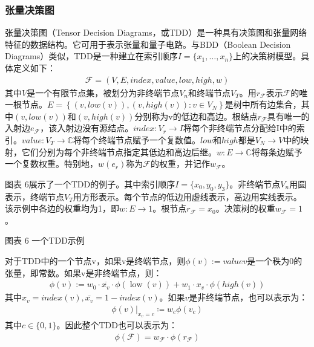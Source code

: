 \subsubsection{张量决策图}
张量决策图（Tensor Decision Diagrams，或TDD）是一种具有决策图和张量网络特征的数据结构\cite{Hong_2022}。它可用于表示张量和量子电路。与BDD（Boolean Decision Diagrams）类似，TDD是一种建立在索引顺序$I=\{x_1,\ldots,x_n\}$上的决策树模型。具体定义如下：
\begin{align}
    \mathcal{F}=\left(V,E,index,value,low,high,w\right)
\end{align}
其中$V$是一个有限节点集，被划分为非终端节点$V_n$和终端节点$V_T$。用$r_{\mathcal{F}}$表示$\mathcal{F}$的唯一根节点。$E=\left\{\left(v,low\left(v\right)\right),\left(v,high\left(v\right)\right):v\in V_N\right\}$是树中所有边集合，其中$\left(v,low\left(v\right)\right)$和$\left(v,high\left(v\right)\right)$分别称为v的低边和高边。根结点$r_{\mathcal{F}}$具有唯一的入射边$e_{\mathcal{F}}$，该入射边没有源结点。$index:V_r\rightarrow I$将每个非终端节点分配给I中的索引。$value:V_T\rightarrow\mathbb{C}$将每个终端节点赋予一个复数值。$low$和$high$都是$V_N\rightarrow V$中的映射，它们分别为每个非终端节点指定其低边和高边后继。$w:E\rightarrow\mathbb{C}$将每条边赋予一个复数权重。特别地，$w\left(e_r\right)$称为$\mathcal{F}$的权重，并记作$w_{\mathcal{F}}$。 
 
图表 6展示了一个TDD的例子。其中索引顺序$I=\{x_0,y_0,y_3\}$。非终端节点$V_n$用圆表示，终端节点$V_T$用方形表示。每个节点的低边用虚线表示，高边用实线表示。该示例中各边的权重均为1，即$w:E\rightarrow 1$。根节点$r_{\mathcal{F}}=x_0$。决策树的权重$w_{\mathcal{F}}=1$。
 
图表 6 一个TDD示例

对于TDD中的一个节点v，如果v是终端节点，则$\phi\left(v\right):= valuev$是一个秩为0的张量，即常数。如果v是非终端节点，则：
\begin{align}
    \phi(v):=w_{0} \cdot \overline{x_{v}} \cdot \phi(\operatorname{low}(v))+w_{1} \cdot x_{v} \cdot \phi(h i g h(v))
\end{align}
其中$x_v=index\left(v\right),\bar{x_v}=1-index\left(v\right)$。如果$v$是非终端节点，也可以表示为：
\begin{align}
    \left.\phi\left(v\right)\right|_{x_v=c}≔w_c \phi (v_c)
\end{align}
其中$c\in\{0,1\}$。因此整个TDD也可以表示为：
\begin{align}
    \phi\left(\mathcal{F}\right)=w_{\mathcal{F}}\cdot\phi\left(r_{\mathcal{F}}\right)
\end{align}
